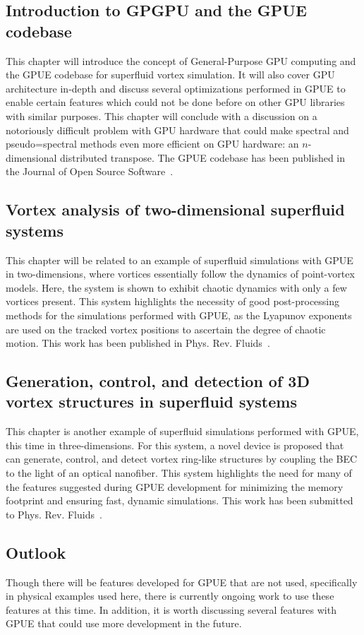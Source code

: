 \subsection*{Introduction to GPGPU and the GPUE codebase}

This chapter will introduce the concept of General-Purpose GPU computing and the GPUE codebase for superfluid vortex simulation.
It will also cover GPU architecture in-depth and discuss several optimizations performed in GPUE to enable certain features which could not be done before on other GPU libraries with similar purposes.
This chapter will conclude with a discussion on a notoriously difficult problem with GPU hardware that could make spectral and pseudo=spectral methods even more efficient on GPU hardware: an $n$-dimensional distributed transpose.
The GPUE codebase has been published in the Journal of Open Source Software~\cite{schloss2018}.

\subsection*{Vortex analysis of two-dimensional superfluid systems}

This chapter will be related to an example of superfluid simulations with GPUE in two-dimensions, where vortices essentially follow the dynamics of point-vortex models.
Here, the system is shown to exhibit chaotic dynamics with only a few vortices present.
This system highlights the necessity of good post-processing methods for the simulations performed with GPUE, as the Lyapunov exponents are used on the tracked vortex positions to ascertain the degree of chaotic motion.
This work has been published in Phys. Rev. Fluids~\cite{zhang2019}.

\subsection*{Generation, control, and detection of 3D vortex structures in superfluid systems}

This chapter is another example of superfluid simulations performed with GPUE, this time in three-dimensions.
For this system, a novel device is proposed that can generate, control, and detect vortex ring-like structures by coupling the BEC to the light of an optical nanofiber.
This system highlights the need for many of the features suggested during GPUE development for minimizing the memory footprint and ensuring fast, dynamic simulations.
This work has been submitted to Phys. Rev. Fluids~\cite{schloss2019}.

\subsection*{Outlook}
Though there will be features developed for GPUE that are not used, specifically in physical examples used here, there is currently ongoing work to use these features at this time.
In addition, it is worth discussing several features with GPUE that could use more development in the future.
